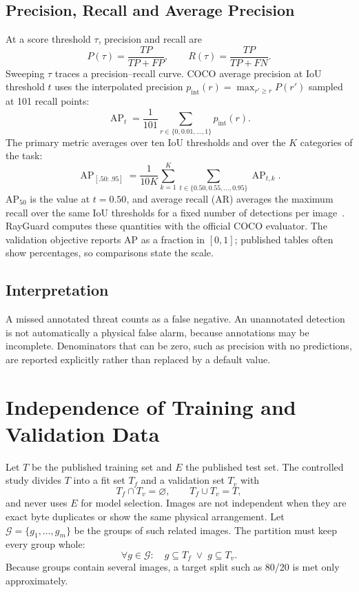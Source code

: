 \subsection{Precision, Recall and Average Precision}
At a score threshold $\tau$, precision and recall are
\begin{equation}
 P(\tau)=\frac{TP}{TP+FP},\qquad R(\tau)=\frac{TP}{TP+FN}.
\end{equation}
Sweeping $\tau$ traces a precision--recall curve. COCO average precision at IoU
threshold $t$ uses the interpolated precision
$p_{\text{int}}(r)=\max_{r'\ge r} P(r')$ sampled at 101 recall points:
\begin{equation}
 \operatorname{AP}_t = \frac{1}{101}\sum_{r\in\{0,0.01,\dots,1\}} p_{\text{int}}(r).
\end{equation}
The primary metric averages over ten IoU thresholds and over the $K$ categories
of the task:
\begin{equation}
 \operatorname{AP}_{[.50:.95]} = \frac{1}{10K}\sum_{k=1}^{K}
 \sum_{t\in\{0.50,0.55,\dots,0.95\}} \operatorname{AP}_{t,k}.
\end{equation}
AP$_{50}$ is the value at $t=0.50$, and average recall (AR) averages the maximum
recall over the same IoU thresholds for a fixed number of detections per
image~\citep{lin2014coco}. RayGuard computes these quantities with the official
COCO evaluator. The validation objective reports AP as a fraction in $[0,1]$;
published tables often show percentages, so comparisons state the scale.

\subsection{Interpretation}
A missed annotated threat counts as a false negative. An unannotated detection is
not automatically a physical false alarm, because annotations may be incomplete.
Denominators that can be zero, such as precision with no predictions, are
reported explicitly rather than replaced by a default value.

\section{Independence of Training and Validation Data}\label{sec:partition}
Let $T$ be the published training set and $E$ the published test set. The
controlled study divides $T$ into a fit set $T_f$ and a validation set $T_v$ with
\begin{equation}
 T_f\cap T_v=\varnothing,\qquad T_f\cup T_v=T,
\end{equation}
and never uses $E$ for model selection. Images are not independent when they are
exact byte duplicates or show the same physical arrangement. Let
$\mathcal{G}=\{g_1,\dots,g_m\}$ be the groups of such related images. The
partition must keep every group whole:
\begin{equation}
 \forall g\in\mathcal{G}:\quad g\subseteq T_f \;\lor\; g\subseteq T_v .
\end{equation}
Because groups contain several images, a target split such as 80/20 is met only
approximately.

